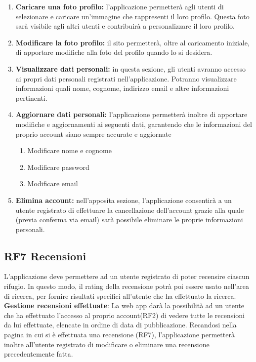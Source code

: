 \documentclass[a4paper,12pt]{article}
\begin{document}
\begin{enumerate} [leftmargin=40pt]
  \item \textbf{Caricare una foto profilo:} l'applicazione permetterà agli utenti di selezionare e caricare un'immagine che rappresenti il loro profilo. Questa foto sarà visibile agli altri utenti e contribuirà a personalizzare il loro profilo.

  \item \textbf{Modificare la foto profilo:} il sito permetterà, oltre al caricamento iniziale, di apportare modifiche alla foto del profilo quando lo si desidera. 

  

  \item \textbf{Visualizzare dati personali:} in questa sezione, gli utenti avranno accesso ai propri dati personali registrati nell'applicazione. Potranno visualizzare informazioni quali nome, cognome, indirizzo email e altre informazioni pertinenti.

  \item \textbf{Aggiornare dati personali:} l'applicazione permetterà inoltre di apportare modifiche e aggiornamenti ai seguenti dati, garantendo che le informazioni del proprio account siano sempre accurate e aggiornate
  
  \begin{enumerate} [leftmargin=40pt]
     \item Modificare nome e cognome
     \item Modificare password
     \item Modificare email
 \end{enumerate}

  \item \textbf{Elimina account:} nell’apposita sezione, l'applicazione consentirà a un utente registrato di effettuare la cancellazione dell'account grazie alla quale (previa conferma via email) sarà possibile eliminare le proprie informazioni personali.
\end{enumerate}


\subsection*{RF7 Recensioni}
L'applicazione deve permettere ad un utente registrato di poter recensire ciascun rifugio.\newline
In questo modo, il rating della recensione potrà poi essere usato nell'area di ricerca, per fornire risultati specifici all'utente che ha effettuato la ricerca. \newline\newline
\textbf{Gestione recensioni effettuate}: La web app darà la possibilità ad un utente che ha effettuato l'accesso al proprio account(RF2) di vedere tutte le recensioni da lui effettuate, elencate in ordine di data di pubblicazione.
Recandosi nella pagina in cui si è effettuata una recensione (RF7), l'applicazione permetterà inoltre all'utente registrato di modificare o eliminare una recensione precedentemente fatta.\newline
\end{document}
